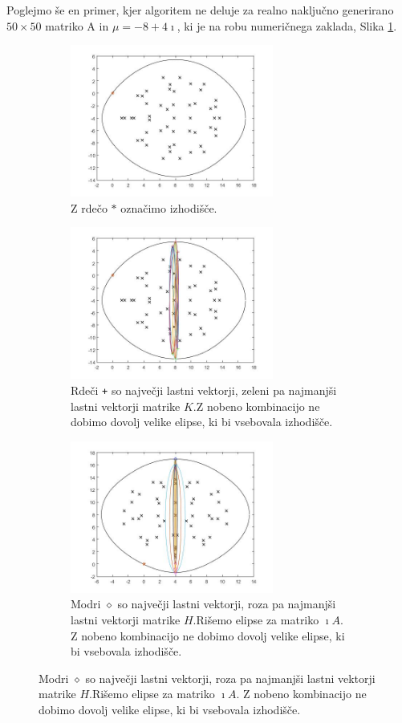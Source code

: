 \documentclass[12pt,a4paper]{amsart}
\theoremstyle{definition}
\theoremstyle{plain}
\begin{document}
Poglejmo še en primer, kjer algoritem ne deluje za realno naključno generirano $50\times 50$ matriko A in $\mu = -8+4\imath$, ki je na robu numeričnega zaklada, Slika \ref{fig:p61}.
\begin{figure}[H]
\begin{subfigure}[t]{0.45\textwidth}
\includegraphics[width=0.9\linewidth,height=5cm]{RC4.jpg}
\caption{Z rdečo $\ast$ označimo izhodišče.}
\label{fig:p61}
\end{subfigure}%
\hfill
\begin{subfigure}[t]{0.45\textwidth}
\includegraphics[width=0.9\linewidth,height=5cm]{RC4e1.jpg}
\caption{Rdeči \verb~+~ so največji lastni vektorji, zeleni pa najmanjši lastni vektorji matrike $K$.\footnotemark[\value{footnote}] Z nobeno kombinacijo ne dobimo dovolj velike elipse, ki bi vsebovala izhodišče.}
\label{fig:p62}
\end{subfigure}
\begin{subfigure}[t]{0.45\textwidth}
\includegraphics[width=0.9\linewidth,height=5cm]{RC4e2.jpg}
\caption{Modri $\diamond$ so največji lastni vektorji, roza pa najmanjši lastni vektorji matrike $H$.\footnotemark[\value{footnote}] Rišemo elipse za matriko $\imath A$. Z nobeno kombinacijo ne dobimo dovolj velike elipse, ki bi vsebovala izhodišče.}

\end{subfigure}
\end{figure}
\end{document}
